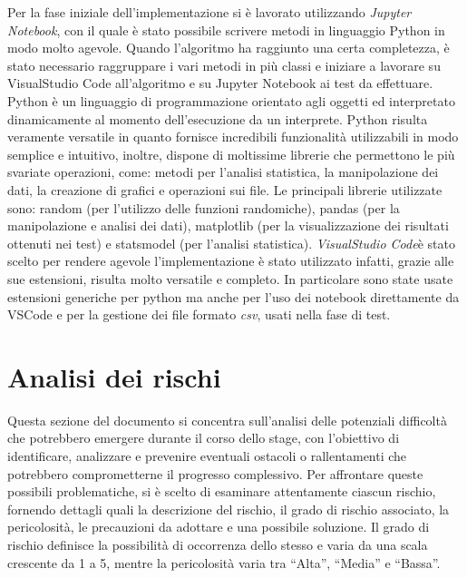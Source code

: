 Per la fase iniziale dell'implementazione si è lavorato utilizzando \emph{Jupyter Notebook}\glsfirstoccur, con il quale è stato possibile scrivere metodi in linguaggio Python in modo molto agevole. Quando l'algoritmo ha raggiunto una certa completezza, è stato necessario raggruppare i vari metodi in più classi e iniziare a lavorare su VisualStudio Code all'algoritmo e su Jupyter Notebook ai test da effettuare.
Python è un linguaggio di programmazione orientato agli oggetti ed interpretato dinamicamente al momento dell’esecuzione da un interprete. Python risulta veramente versatile in quanto fornisce incredibili funzionalità utilizzabili in modo semplice e intuitivo, inoltre, dispone di moltissime librerie che permettono le più svariate operazioni, come: metodi per l'analisi statistica, la manipolazione dei dati, la creazione di grafici e operazioni sui file. 
Le principali librerie utilizzate sono: random (per l'utilizzo delle funzioni randomiche), pandas (per la manipolazione e analisi dei dati), matplotlib (per la visualizzazione dei risultati ottenuti nei test) e statsmodel (per l'analisi statistica).
\emph{VisualStudio Code}\glsfirstoccur è stato scelto per rendere agevole l'implementazione è stato utilizzato infatti, grazie alle sue estensioni, risulta molto versatile e completo. In particolare sono state usate estensioni generiche per python ma anche per l'uso dei notebook direttamente da VSCode e per la gestione dei file formato \emph{csv}\glsfirstoccur, usati nella fase di test.

\section{Analisi dei rischi}

Questa sezione del documento si concentra sull’analisi delle potenziali difficoltà che potrebbero emergere durante il corso dello stage, con l’obiettivo di identificare, analizzare e prevenire eventuali ostacoli o rallentamenti che potrebbero comprometterne il progresso complessivo. Per affrontare queste possibili problematiche, si è scelto di esaminare attentamente ciascun rischio, fornendo dettagli quali la descrizione del rischio, il grado di rischio associato, la pericolosità, le precauzioni da adottare e una possibile soluzione. Il grado di rischio definisce la possibilità di occorrenza dello stesso e varia da una scala crescente da 1 a 5, mentre la pericolosità varia tra “Alta”, “Media” e “Bassa”. 

